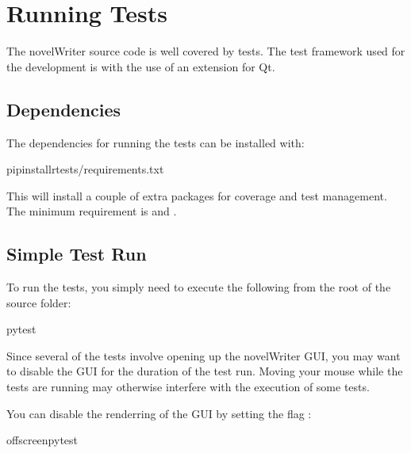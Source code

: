 \documentclass[a4paper,11pt,english]{sphinxmanual}
\begin{document}
\chapter{Running Tests}
\label{\detokenize{tech_tests:running-tests}}\label{\detokenize{tech_tests:a-pytest}}\label{\detokenize{tech_tests::doc}}
\sphinxAtStartPar
The novelWriter source code is well covered by tests. The test framework used for the development
is  with the use of an extension for Qt.


\section{Dependencies}
\label{\detokenize{tech_tests:dependencies}}
\sphinxAtStartPar
The dependencies for running the tests can be installed with:

\begin{sphinxVerbatim}[commandchars=\\\{\}]
pipinstall\PYGZhy{}rtests/requirements.txt
\end{sphinxVerbatim}

\sphinxAtStartPar
This will install a couple of extra packages for coverage and test management. The minimum
requirement is  and .


\section{Simple Test Run}
\label{\detokenize{tech_tests:simple-test-run}}
\sphinxAtStartPar
To run the tests, you simply need to execute the following from the root of the source folder:

\begin{sphinxVerbatim}[commandchars=\\\{\}]
pytest
\end{sphinxVerbatim}

\sphinxAtStartPar
Since several of the tests involve opening up the novelWriter GUI, you may want to disable the GUI
for the duration of the test run. Moving your mouse while the tests are running may otherwise
interfere with the execution of some tests.

\sphinxAtStartPar
You can disable the renderring of the GUI by setting the flag :

\begin{sphinxVerbatim}[commandchars=\\\{\}]
offscreenpytest
\end{sphinxVerbatim}
\end{document}
